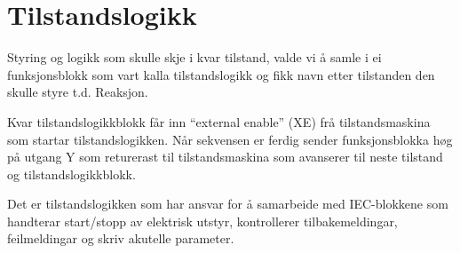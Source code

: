 \newpage
\section{Tilstandslogikk}
\thispagestyle{fancy}

Styring og logikk som skulle skje i kvar tilstand, valde vi å samle i ei funksjonsblokk som vart kalla tilstandslogikk og fikk navn etter tilstanden
den skulle styre t.d. Reaksjon. %

Kvar tilstandslogikkblokk får inn ``external enable'' (\gls{XE}) frå tilstandsmaskina som startar tilstandslogikken. Når sekvensen er ferdig sender
funksjonsblokka høg på utgang Y som returerast til tilstandsmaskina som avanserer til neste tilstand og tilstandslogikkblokk.

Det er tilstandslogikken som har ansvar for å samarbeide med \gls{IEC}-blokkene som handterar
start/stopp av elektrisk utstyr, kontrollerer tilbakemeldingar, feilmeldingar og skriv akutelle parameter. \newline \newline \newline

